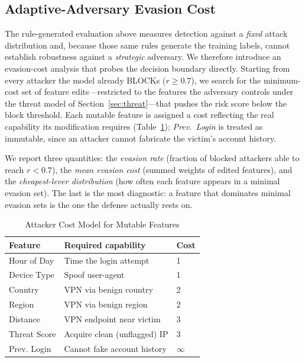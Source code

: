 \documentclass[conference]{IEEEtran}
\begin{document}
\subsection{Adaptive-Adversary Evasion Cost}
The rule-generated evaluation above measures detection against a \textit{fixed} attack distribution and, because those same rules generate the training labels, cannot establish robustness against a \textit{strategic} adversary. We therefore introduce an evasion-cost analysis that probes the decision boundary directly. Starting from every attacker the model already BLOCKs ($r \ge 0.7$), we search for the minimum-cost set of feature edits---restricted to the features the adversary controls under the threat model of Section~\ref{sec:threat}---that pushes the risk score below the block threshold. Each mutable feature is assigned a cost reflecting the real capability its modification requires (Table~\ref{tab:evcost}); \textit{Prev.\ Login} is treated as immutable, since an attacker cannot fabricate the victim's account history.

We report three quantities: the \textit{evasion rate} (fraction of blocked attackers able to reach $r < 0.7$), the \textit{mean evasion cost} (summed weights of edited features), and the \textit{cheapest-lever distribution} (how often each feature appears in a minimal evasion set). The last is the most diagnostic: a feature that dominates minimal evasion sets is the one the defense actually rests on.

\begin{table}[t]
\caption{Attacker Cost Model for Mutable Features}
\label{tab:evcost}
\centering
\begin{tabular}{@{}lll@{}}
\toprule
Feature & Required capability & Cost \\
\midrule
Hour of Day & Time the login attempt & 1 \\
Device Type & Spoof user-agent & 1 \\
Country & VPN via benign country & 2 \\
Region & VPN via benign region & 2 \\
Distance & VPN endpoint near victim & 3 \\
Threat Score & Acquire clean (unflagged) IP & 3 \\
Prev. Login & Cannot fake account history & $\infty$ \\
\bottomrule
\end{tabular}
\end{table}
\end{document}
